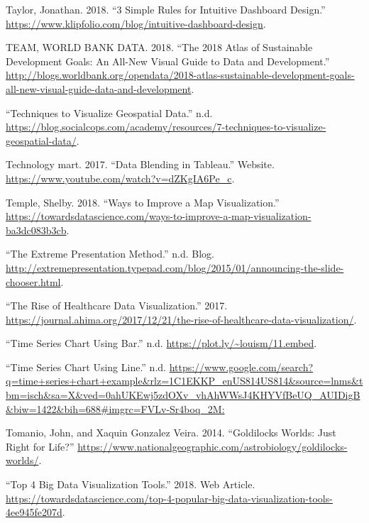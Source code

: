 \documentclass[]{book}
\begin{document}
\leavevmode\hypertarget{ref-intuitive_dash}{}%
Taylor, Jonathan. 2018. ``3 Simple Rules for Intuitive Dashboard Design.'' \url{https://www.klipfolio.com/blog/intuitive-dashboard-design}.

\leavevmode\hypertarget{ref-world_bank_data}{}%
TEAM, WORLD BANK DATA. 2018. ``The 2018 Atlas of Sustainable Development Goals: An All-New Visual Guide to Data and Development.'' \url{http://blogs.worldbank.org/opendata/2018-atlas-sustainable-development-goals-all-new-visual-guide-data-and-development}.

\leavevmode\hypertarget{ref-Popular_Map_Types2}{}%
``Techniques to Visualize Geospatial Data.'' n.d. \url{https://blog.socialcops.com/academy/resources/7-techniques-to-visualize-geospatial-data/}.

\leavevmode\hypertarget{ref-datablendingintableau}{}%
Technology mart. 2017. ``Data Blending in Tableau.'' Website. \url{https://www.youtube.com/watch?v=dZKgIA6Pe_c}.

\leavevmode\hypertarget{ref-profit_ratio}{}%
Temple, Shelby. 2018. ``Ways to Improve a Map Visualization.'' \url{https://towardsdatascience.com/ways-to-improve-a-map-visualization-ba3dc083b3cb}.

\leavevmode\hypertarget{ref-extremepre}{}%
``The Extreme Presentation Method.'' n.d. Blog. \url{http://extremepresentation.typepad.com/blog/2015/01/announcing-the-slide-chooser.html}.

\leavevmode\hypertarget{ref-rise_of_healthcare}{}%
``The Rise of Healthcare Data Visualization.'' 2017. \url{https://journal.ahima.org/2017/12/21/the-rise-of-healthcare-data-visualization/}.

\leavevmode\hypertarget{ref-Time_Series_chart_bar}{}%
``Time Series Chart Using Bar.'' n.d. \url{https://plot.ly/~louism/11.embed}.

\leavevmode\hypertarget{ref-Time_Series_chart_line}{}%
``Time Series Chart Using Line.'' n.d. \url{https://www.google.com/search?q=time+series+chart+example\&rlz=1C1EKKP_enUS814US814\&source=lnms\&tbm=isch\&sa=X\&ved=0ahUKEwj5zdOXv_vhAhWWsJ4KHYVfBeUQ_AUIDigB\&biw=1422\&bih=688\#imgrc=FVLv-Sr4boq_2M:}

\leavevmode\hypertarget{ref-goldilocks_worlds}{}%
Tomanio, John, and Xaquin Gonzalez Veira. 2014. ``Goldilocks Worlds: Just Right for Life?'' \url{https://www.nationalgeographic.com/astrobiology/goldilocks-worlds/}.

\leavevmode\hypertarget{ref-top4_viz_tools}{}%
``Top 4 Big Data Visualization Tools.'' 2018. Web Article. \url{https://towardsdatascience.com/top-4-popular-big-data-visualization-tools-4ee945fe207d}.
\end{document}
